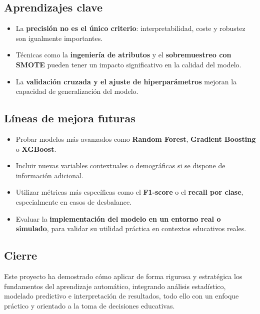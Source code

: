 \documentclass[11pt,a4paper]{article}
\begin{document}
\subsection*{Aprendizajes clave}

\begin{itemize}
    \item La \textbf{precisión no es el único criterio}: interpretabilidad, coste y robustez son igualmente importantes.
    \item Técnicas como la \textbf{ingeniería de atributos} y el \textbf{sobremuestreo con SMOTE} pueden tener un impacto significativo en la calidad del modelo.
    \item La \textbf{validación cruzada y el ajuste de hiperparámetros} mejoran la capacidad de generalización del modelo.
\end{itemize}

\subsection*{Líneas de mejora futuras}

\begin{itemize}
    \item Probar modelos más avanzados como \textbf{Random Forest}, \textbf{Gradient Boosting} o \textbf{XGBoost}.
    \item Incluir nuevas variables contextuales o demográficas si se dispone de información adicional.
    \item Utilizar métricas más específicas como el \textbf{F1-score} o el \textbf{recall por clase}, especialmente en casos de desbalance.
    \item Evaluar la \textbf{implementación del modelo en un entorno real o simulado}, para validar su utilidad práctica en contextos educativos reales.
\end{itemize}

\subsection*{Cierre}

Este proyecto ha demostrado cómo aplicar de forma rigurosa y estratégica los fundamentos del aprendizaje automático, integrando análisis estadístico, modelado predictivo e interpretación de resultados, todo ello con un enfoque práctico y orientado a la toma de decisiones educativas.

\newpage
\end{document}
